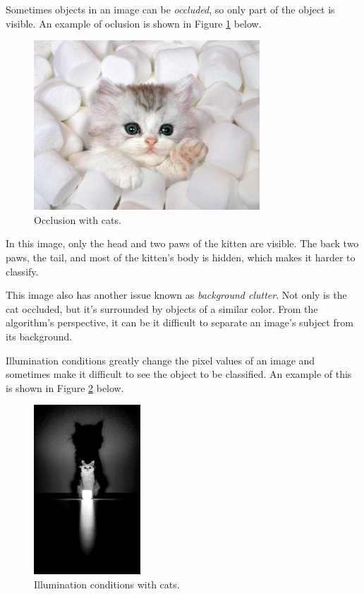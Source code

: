 \noindent Sometimes objects in an image can be \textit{occluded}, so only part
of the object is visible. An example of oclusion is shown in Figure
\ref{fig:occlusion} below.

\begin{figure}[ht!] \centering
\includegraphics[height=2.5in]{../figures/kitty_occlusion.jpg}
\caption{Occlusion with cats.} \label{fig:occlusion} \end{figure}

\noindent In this image, only the head and two paws of the kitten are visible.
The back two paws, the tail, and most of the kitten's body is hidden, which
makes it harder to classify.

\noindent This image also has another issue known as \textit{background
clutter}. Not only is the cat occluded, but it's surrounded by objects of a
similar color.  From the algorithm's perspective, it can be it difficult to
separate an image's subject from its background.

\noindent Illumination conditions greatly change the pixel values of an image
and sometimes make it difficult to see the object to be classified. An example
of this is shown in Figure \ref{fig:illumination} below.

\begin{figure}[ht!] \centering
\includegraphics[height=2.5in]{../figures/kitty_illumination.jpg}
\caption{Illumination conditions with cats.} \label{fig:illumination}
\end{figure}

